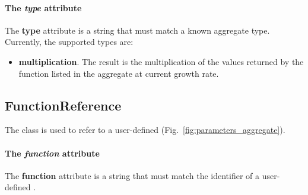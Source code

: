 \paragraph{The \textit{type} attribute}
The \textbf{type} attribute is a string that must match a known aggregate type.
Currently, the supported types are:
\begin{itemize}
  \item \textbf{multiplication}.
  The result is the multiplication of the values returned by the function
  listed in the aggregate at current growth rate.
\end{itemize}


\subsection{FunctionReference}
\label{sec:function_reference}

The \functionreference{} class is used to refer to a user-defined \function{}
(Fig.~\ref{fig:parameters_aggregate}).

\paragraph{The \textit{function} attribute}
The \textbf{function} attribute is a string that must match the identifier
of a user-defined \function{}.
